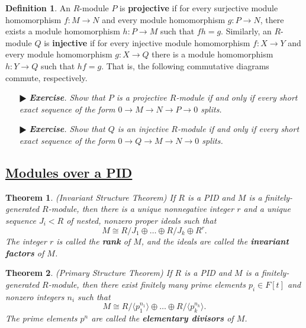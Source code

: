 \documentclass[11pt]{amsart}
\newtheorem*{theorem*}{Theorem}
\theoremstyle{definition}
\newtheorem*{definition*}{Definition}
\renewcommand\:{\colon}
\newcommand{\1}{\mathds{1}}
\newcommand{\exc}[1]{\vspace{-2.5pt}\begin{itemize}[leftmargin=15pt]\item[$\RHD$] \textit{\textbf{Exercise}. #1}\end{itemize}}
\begin{document}
\begin{definition*}
	An $R$-module $P$ is \textbf{projective} if for every surjective module homomorphism $f\: M \to N$ and every module homomorphism $g\: P \to N$, there exists a module homomorphism $h\: P \to M$ such that $fh = g$. Similarly, an $R$-module $Q$ is \textbf{injective} if for every injective module homomorphism $f\: X \to Y$ and every module homomorphism $g\: X \to Q$ there is a module homomorphism $h\: Y \to Q$ such that $hf = g$. That is, the following commutative diagrams commute, respectively.
	\begin{center}
		\hskip30pt
	\end{center}
\end{definition*}

\exc{Show that $P$ is a projective $R$-module if and only if every short exact sequence of the form $0 \to M \to N \to P \to 0$ splits.}
\exc{Show that $Q$ is an injective $R$-module if and only if every short exact sequence of the form $0 \to Q \to M \to N \to 0$ splits.}

\vskip20pt

\subsection*{\underline{Modules over a PID}}

\begin{theorem*}
	\textnormal{(Invariant Structure Theorem)} If $R$ is a PID and $M$ is a finitely-generated $R$-module, then there is a unique nonnegative integer $r$ and a unique sequence $J_i < R$ of nested, nonzero proper ideals such that
		\[ M \cong R/J_1 \oplus \dots \oplus R/J_k \oplus R^r. \]
	The integer $r$ is called the \textbf{rank} of $M$, and the ideals are called the \textbf{invariant factors} of $M$.
\end{theorem*}

\begin{theorem*}
	\textnormal{(Primary Structure Theorem)} If $R$ is a PID and $M$ is a finitely-generated $R$-module, then there exist finitely many prime elements $p_i \in F[t]$ and nonzero integers $n_i$ such that
		\[ M \cong R/ \langle p_1^{n_1} \rangle \oplus \dots \oplus R/ \langle p_k^{n_k} \rangle. \]
	The prime elements $p^n$ are called the \textbf{elementary divisors} of $M$.
\end{theorem*}
\end{document}
